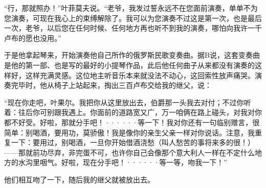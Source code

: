 \documentclass[12pt, UTF8]{ctexbook}
\begin{document}
\par “行，那就照办！”叶菲莫夫说。“老爷，我发过誓永远不在您面前演奏，单单不为您演奏，可现在我心上的束缚解除了。我可以为您演奏不过这是第一次，也是最后一次，老爷，以后您在任何时候、任何地方再也听不到我的演奏，哪怕向我许一千卢布的愿也没用。”
\par 于是他拿起琴来，开始演奏他自己所作的俄罗斯民歌变奏曲。据B说，这套变奏曲是他的第一部、也是写的最好的小提琴作品，此后他任何曲子从来都没有演奏的这样好，这样充满灵感。这位地主听音乐本来就没法不动心，这回索性放声痛哭。演奏完毕时，他从椅子上站起来，掏出三百卢布交给我的继父，说：
\par “现在你走吧，叶果尔。我把你从这里放出去，伯爵那一头我去对付；不过你听着：往后你可别跟我遇上。你面前的道路宽又广，万一咱俩在路上碰头，对我对你都不好受。好啦，那就分手吧！······等一下！我对你还有一句临别赠言，很简单：别喝酒，要用功，莫骄傲！我是像你的亲生父亲一样对你说话。注意，我重复一下：要用过，别喝酒，一旦你开始借酒浇愁（叫人愁苦的事将来多的很！）——那就前功尽弃，非完蛋不可，也许你自己会像那个意大利人一样在不定什么地方的水沟里咽气。好啦，现在分手吧！······等一等，吻我一下！”
\par 他们相互吻了一下，随后我的继父就被放出去。
\end{document}
